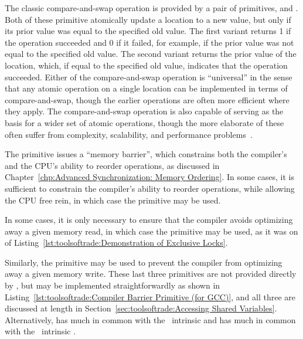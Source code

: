 The classic compare-and-swap operation is provided by a pair of
primitives,  and
.
Both of these primitive atomically update a location to a new value,
but only if its prior value was equal to the specified old value.
The first variant returns 1 if the operation succeeded and 0 if it
failed, for example, if the prior value was not equal to the specified
old value.
The second variant returns the prior value of the location, which, if
equal to the specified old value, indicates that the operation succeeded.
Either of the compare-and-swap operation is ``universal'' in the sense
that any atomic operation on a single location can be implemented in
terms of compare-and-swap, though the earlier operations are often
more efficient where they apply.
The compare-and-swap operation is also capable of serving as the basis
for a wider set of atomic operations, though the more elaborate of
these often suffer from complexity, scalability, and performance
problems~\cite{MauriceHerlihy90a}.

\QuickQuizEnd

The  primitive issues a ``memory barrier'',
which constrains both the compiler's and the CPU's ability to reorder
operations, as discussed in
Chapter~\ref{chp:Advanced Synchronization: Memory Ordering}.
In some cases, it is sufficient to constrain the compiler's ability
to reorder operations, while allowing the CPU free rein, in which
case the  primitive may be used.
\begin{fcvref}
In some cases, it is only necessary to ensure that the compiler
avoids optimizing away a given memory read, in which case the
 primitive may be used, as it was on  of
Listing~\ref{lst:toolsoftrade:Demonstration of Exclusive Locks}.
\end{fcvref}
Similarly, the  primitive may be used to prevent the
compiler from optimizing away a given memory write.
These last three primitives are not provided directly by \GCC,
but may be implemented straightforwardly as shown in
Listing~\ref{lst:toolsoftrade:Compiler Barrier Primitive (for GCC)},
and all three are discussed at length in
Section~\ref{sec:toolsoftrade:Accessing Shared Variables}.
Alternatively,  has much in common with
the \GCC\  intrinsic
and  has much in common with the \GCC\ 
intrinsic .
\IXaltx{}{Atomic operation}{|)}

